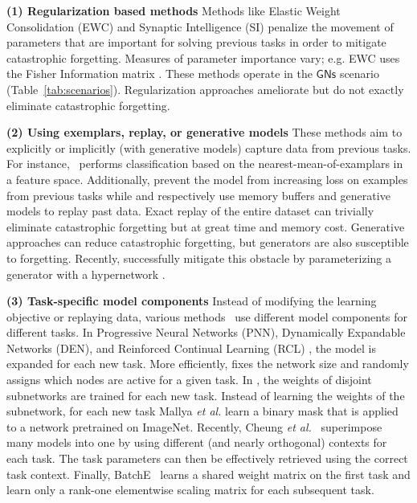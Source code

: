 \documentclass{article}
\newcommand{\casename}[1]{\ensuremath{\mathsf{#1}}\xspace}
\newcommand{\tabref}[1]{Table~\ref{tab:#1}}
\begin{document}
\textbf{(1) Regularization based methods }
Methods like Elastic Weight Consolidation (EWC) \cite{kirkpatrick2017overcoming} and Synaptic Intelligence (SI) \cite{zenke2017continual} penalize the movement of parameters that are important for solving previous tasks 
in order to mitigate catastrophic forgetting.
Measures of parameter importance vary; e.g. EWC uses the Fisher Information matrix \cite{pascanu2013revisiting}. These methods operate in the \casename{GNs} scenario (\tabref{scenarios}).
Regularization approaches ameliorate but do not exactly eliminate catastrophic forgetting.

\textbf{(2) Using exemplars, replay, or generative models }
These methods aim to explicitly or implicitly (with generative models) capture data from previous tasks. For instance,~\cite{rebuffi2017icarl} performs classification based on the nearest-mean-of-examplars in a feature space. Additionally, \cite{lopez2017gradient, chaudhry2018efficient} prevent the model from increasing loss on examples from previous tasks while \cite{rolnick2019experience} and \cite{shin2017continual} respectively use memory buffers and generative models to replay past data.
Exact replay of the entire dataset can trivially eliminate catastrophic forgetting but at great time and memory cost. Generative approaches can reduce catastrophic forgetting, but generators are also susceptible to forgetting. Recently, \cite{Oswald2020Continual} successfully mitigate this obstacle by parameterizing a generator with a hypernetwork \cite{ha2016hypernetworks}.  

\textbf{(3) Task-specific model components }
Instead of modifying the learning objective or replaying data, various methods~\cite{rusu2016progressive,yoon2017lifelong, mallya2018packnet, mallya2018piggyback, masse2018alleviating, xu2018reinforced,cheung2019superposition, golkar2019continual, wen2020batchensemble} use different model components for different tasks. In Progressive Neural Networks (PNN), Dynamically Expandable Networks (DEN), and Reinforced Continual Learning (RCL) \cite{rusu2016progressive, yoon2017lifelong, xu2018reinforced}, the model is expanded for each new task. More efficiently, \cite{masse2018alleviating} fixes the network size and randomly assigns which nodes are active for a given task. In \cite{mallya2018packnet, golkar2019continual}, the weights of disjoint subnetworks are trained for each new task. Instead of learning the weights of the subnetwork, for each new task Mallya \textit{et al.} \cite{mallya2018piggyback} learn a binary mask that is applied to a network pretrained on ImageNet. 
%
Recently, Cheung \textit{et al.}~\cite{cheung2019superposition} superimpose many models into one by using different (and nearly orthogonal) contexts for each task. The task parameters can then be effectively retrieved using the correct task context.
Finally, BatchE~\cite{wen2020batchensemble} learns a shared weight matrix on the first task and learn only a rank-one elementwise scaling matrix for each subsequent task.
\end{document}

